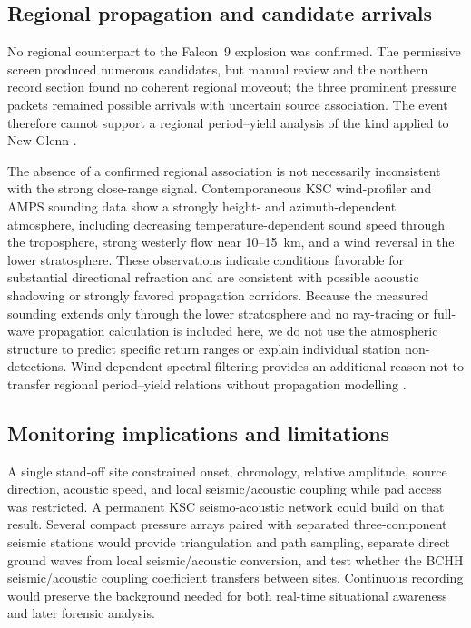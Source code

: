 \documentclass[]{seismica}
\begin{document}
\subsection{Regional propagation and candidate arrivals}

No regional counterpart to the Falcon~9 explosion was confirmed. The
permissive screen produced numerous candidates, but manual review and the
northern record section found no coherent regional moveout; the three
prominent pressure packets remained possible arrivals with uncertain source association. The event therefore
cannot support a regional period--yield analysis of the kind applied to New
Glenn \citep{silber_scamfer_newglenn_2026}.

The absence of a confirmed regional association is not necessarily inconsistent with the strong
close-range signal. Contemporaneous KSC wind-profiler and AMPS sounding data
show a strongly height- and azimuth-dependent atmosphere, including decreasing
temperature-dependent sound speed through the troposphere, strong westerly
flow near 10--15~km, and a wind reversal in the lower stratosphere. These
observations indicate conditions favorable for substantial directional
refraction and are consistent with possible acoustic shadowing or strongly
favored propagation corridors. Because the measured sounding extends only
through the lower stratosphere and no ray-tracing or full-wave propagation
calculation is included here, we do not use the atmospheric structure to
predict specific return ranges or explain individual station
non-detections. Wind-dependent spectral filtering provides an additional
reason not to transfer regional period--yield relations without propagation
modelling \citep{silber_wind_filtering_2026}.

\subsection{Monitoring implications and limitations}

A single stand-off site constrained onset, chronology, relative amplitude,
source direction, acoustic speed, and local seismic/acoustic coupling while pad
access was restricted. A permanent KSC seismo-acoustic network could build on
that result. Several compact pressure arrays paired with separated
three-component seismic stations would provide triangulation and path sampling,
separate direct ground waves from local seismic/acoustic conversion, and test
whether the BCHH seismic/acoustic coupling coefficient transfers between sites. Continuous
recording would preserve the background needed for both real-time situational
awareness and later forensic analysis.
\end{document}
